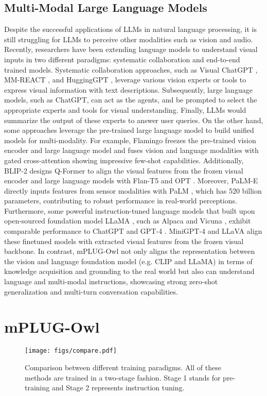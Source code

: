 \documentclass{article}
\newcommand{\modelname}{mPLUG-Owl\xspace}
\begin{document}
\subsection{Multi-Modal Large Language Models}
Despite the successful applications of LLMs in natural language processing, it is still struggling for LLMs to perceive other modalities such as vision and audio. Recently, researchers have been extending language models to understand visual inputs in two different paradigms: systematic collaboration and end-to-end trained models. Systematic collaboration approaches, such as Visual ChatGPT \citep{visualchatgpt}, MM-REACT \citep{mmreact}, and HuggingGPT \citep{hugginggpt}, leverage various vision experts or tools to express visual information with text descriptions. Subsequently, large language models, such as ChatGPT, can act as the agents, and be prompted to select the appropriate experts and tools for visual understanding. Finally, LLMs would summarize the output of these experts to answer user queries. 
On the other hand, some approaches \citep{blip2, flamingo, llava} leverage the pre-trained large language model to build unified models for multi-modality.
For example, Flamingo \citep{flamingo} freezes the pre-trained vision encoder and large language model and fuses vision and language modalities with gated cross-attention showing impressive few-shot capabilities. Additionally, BLIP-2 \citep{blip2} designs Q-Former to align the visual features from the frozen visual encoder and large language models with Flan-T5 \citep{flant5} and OPT \citep{opt}. Moreover, PaLM-E \citep{palm-e} directly inputs features from sensor modalities with PaLM \citep{palm}, which has 520 billion parameters, contributing to robust performance in real-world perceptions. Furthermore, some powerful instruction-tuned language models that built upon open-sourced foundation model LLaMA \citep{llama}, such as Alpaca \citep{alpaca} and Vicuna \citep{vicuna}, exhibit comparable performance to ChatGPT \citep{chatgpt} and GPT-4 \citep{gpt4}. MiniGPT-4 \citep{minigpt4} and LLaVA \citep{llava} align these finetuned models with extracted visual features from the frozen visual backbone. In contrast, \modelname not only aligns the representation between the vision and language foundation model (e.g. CLIP and LLaMA) in terms of knowledge acquisition and grounding to the real world but also can understand language and multi-modal instructions, showcasing strong zero-shot generalization and multi-turn conversation capabilities.


\section{mPLUG-Owl}
\begin{figure}[!ht]
    \centering
    \texttt{[image: figs/compare.pdf]}
    \caption{Comparison between different training paradigms. All of these methods are trained in a two-stage fashion. Stage 1 stands for pre-training and Stage 2 represents instruction tuning.}
    \label{fig:compare_method}
    \vspace{-2mm}
\end{figure}
\end{document}
